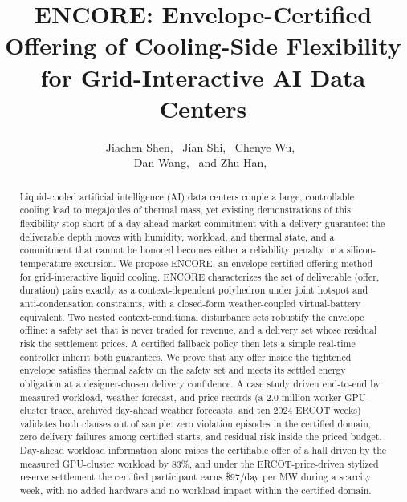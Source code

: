 \documentclass[journal]{IEEEtran}
\begin{document}
\title{{\fontsize{22}{24}\selectfont ENCORE: Envelope-Certified Offering of
Cooling-Side Flexibility for Grid-Interactive AI Data Centers}}

\author{%
Jiachen Shen,~
Jian Shi,~
Chenye Wu,~\\
Dan Wang,~
and Zhu Han,~%
\vspace{-10mm}%
}

\maketitle

\begin{abstract}
Liquid-cooled artificial intelligence (AI) data centers couple a large,
controllable cooling load to megajoules of thermal mass, yet existing
demonstrations of this flexibility stop short of a day-ahead market
commitment with a delivery guarantee: the deliverable depth moves with
humidity, workload, and thermal state, and a commitment that cannot be
honored becomes either a reliability penalty or a silicon-temperature
excursion. We propose ENCORE, an
envelope-certified offering method for grid-interactive liquid cooling.
ENCORE characterizes the set of deliverable (offer, duration) pairs exactly as
a context-dependent polyhedron under joint hotspot and anti-condensation
constraints, with a closed-form weather-coupled virtual-battery equivalent.
Two nested context-conditional disturbance sets robustify the envelope
offline: a safety set that is never traded for revenue, and a delivery set
whose residual risk the settlement prices. A certified fallback policy then
lets a simple real-time controller inherit both guarantees. We prove that any
offer inside the tightened envelope satisfies thermal safety on the safety
set and meets its settled energy obligation at a designer-chosen delivery
confidence. A case study driven end-to-end by measured workload,
weather-forecast, and price records (a 2.0-million-worker GPU-cluster
trace, archived day-ahead weather forecasts, and ten 2024 ERCOT weeks)
validates both clauses out of sample: zero violation episodes in the
certified domain, zero delivery failures among certified starts, and
residual risk inside the priced budget. Day-ahead workload information
alone raises the certifiable offer of a hall driven by the measured
GPU-cluster workload by $83\%$, and under the ERCOT-price-driven stylized
reserve settlement the certified participant earns \$$97$/day per MW during
a scarcity week, with no added hardware and no workload impact within the
certified domain.
\end{abstract}
\end{document}
